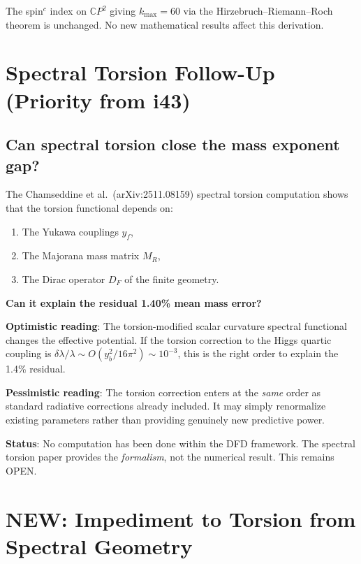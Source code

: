 \documentclass[11pt,a4paper]{article}
\newcommand{\NEW}{\textcolor{dfdblue}{\textbf{NEW}}}
\newcommand{\CP}{\mathbb{C}P}
\begin{document}
The spin$^c$ index on $\CP^2$ giving $k_{\max} = 60$ via the Hirzebruch--Riemann--Roch theorem is unchanged. No new mathematical results affect this derivation.

\section{Spectral Torsion Follow-Up (Priority from i43)}

\subsection{Can spectral torsion close the mass exponent gap?}

\begin{tcolorbox}[colback=yellow!5!white, colframe=yellow!60!black,
  title={HONEST ASSESSMENT: Spectral Torsion $\to$ Yukawa Corrections}]

The Chamseddine et al.\ (arXiv:2511.08159) spectral torsion computation shows that the torsion functional depends on:
\begin{enumerate}
\item The Yukawa couplings $y_f$,
\item The Majorana mass matrix $M_R$,
\item The Dirac operator $D_F$ of the finite geometry.
\end{enumerate}

\textbf{Can it explain the residual 1.40\% mean mass error?}

\textbf{Optimistic reading}: The torsion-modified scalar curvature spectral functional changes the effective potential. If the torsion correction to the Higgs quartic coupling is $\delta\lambda / \lambda \sim O(y_b^2 / 16\pi^2) \sim 10^{-3}$, this is the right order to explain the 1.4\% residual.

\textbf{Pessimistic reading}: The torsion correction enters at the \emph{same} order as standard radiative corrections already included. It may simply renormalize existing parameters rather than providing genuinely new predictive power.

\textbf{Status}: No computation has been done within the DFD framework. The spectral torsion paper provides the \emph{formalism}, not the numerical result. This remains OPEN.
\end{tcolorbox}

\section{\NEW: Impediment to Torsion from Spectral Geometry}
\end{document}
